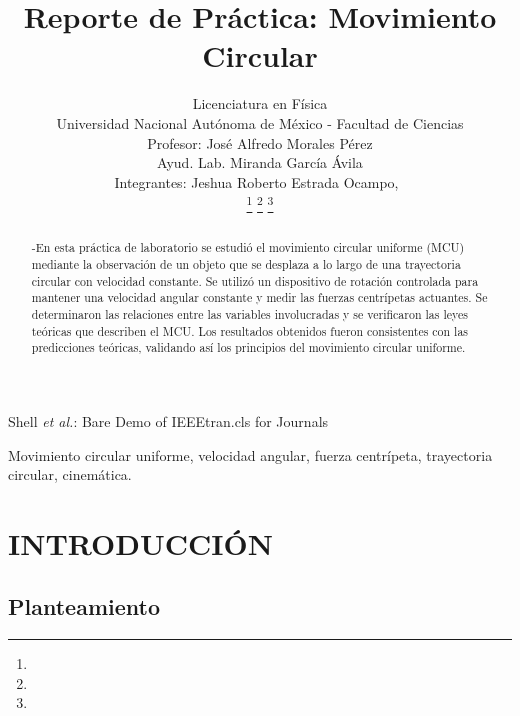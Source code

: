 \documentclass[journal]{IEEEtran}
\begin{document}
\title{Reporte de Práctica: Movimiento Circular }

\author{Licenciatura en Física	\\
Universidad Nacional Autónoma de México - Facultad de Ciencias\\
Profesor: José Alfredo Morales Pérez\\
Ayud. Lab.	Miranda García Ávila\\
Integrantes: Jeshua Roberto Estrada Ocampo,~\\

            
\thanks{}%
\thanks{}%
\thanks{}}

%
{Shell \MakeLowercase{\textit{et al.}}: Bare Demo of IEEEtran.cls for Journals}

\maketitle

\begin{abstract}
-En esta práctica de laboratorio se estudió el movimiento circular uniforme (MCU) mediante la observación de un objeto que se desplaza a lo largo de una trayectoria circular con velocidad constante. Se utilizó un dispositivo de rotación controlada para mantener una velocidad angular constante y medir las fuerzas centrípetas actuantes. Se determinaron las relaciones entre las variables involucradas y se verificaron las leyes teóricas que describen el MCU. Los resultados obtenidos fueron consistentes con las predicciones teóricas, validando así los principios del movimiento circular uniforme.
\end{abstract}

\begin{IEEEkeywords}
Movimiento circular uniforme, velocidad angular, fuerza centrípeta, trayectoria circular, cinemática.
\end{IEEEkeywords}

\IEEEpeerreviewmaketitle

\section{INTRODUCCIÓN}
\subsection{Planteamiento}
\end{document}
